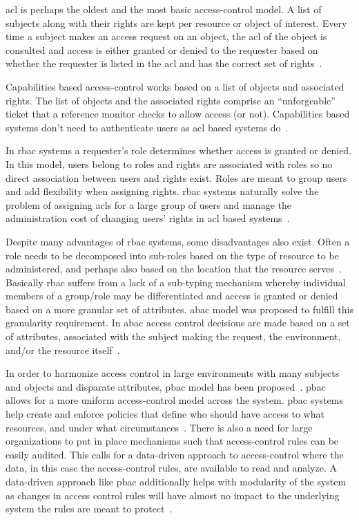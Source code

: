 \ac{acl} is perhaps the oldest and the most basic access-control model. A list of subjects along with their rights are kept per resource or object of interest. Every time a subject makes an access request on an object, the \ac{acl} of the object is consulted and access is either granted or denied to the requester based on whether the requester is listed in the \ac{acl} and has the correct set of rights~\cite{nist}.

Capabilities based access-control works based on a list of objects and associated rights. The list of objects and the associated rights comprise an ``unforgeable'' ticket that a reference monitor checks to allow access (or not). Capabilities based systems don't need to authenticate users as \ac{acl} based systems do~\cite{nist}.

In \ac{rbac} systems a requester's role determines whether access is granted or denied. In this model, users belong to roles and rights are associated with roles so no direct association between users and rights exist. Roles are meant to group users and add flexibility when assigning rights. \ac{rbac} systems naturally solve the problem of assigning \ac{acl}s for a large group of users and manage the administration cost of changing users' rights in \ac{acl} based systems~\cite{nist}.


Despite many advantages of \ac{rbac} systems, some disadvantages also exist. Often a role needs to be decomposed into sub-roles based on the type of resource to be administered, and perhaps also based on the location that the resource serves~\cite{nist}. Basically \ac{rbac} suffers from a lack of a sub-typing mechanism whereby individual members of a group/role may be differentiated and access is granted or denied based on a more granular set of attributes. \ac{abac} model was proposed to fulfill this granularity requirement. In \ac{abac} access control decisions are made based on a set of attributes, associated with the subject making the request, the environment, and/or the resource itself~\cite{nist}. 

In order to harmonize access control in large environments with many subjects and objects and disparate attributes, \ac{pbac} model has been proposed~\cite{nist}. \ac{pbac} allows for a more uniform access-control model across the system. \ac{pbac} systems help create and enforce policies
that define who should have access to what resources, and under what circumstances~\cite{nist}.
There is also a need for large organizations to put in place mechanisms such that access-control rules can be easily audited. This calls for a data-driven approach to access-control where the data, in this case the access-control rules, are available to read and analyze. A data-driven approach like \ac{pbac} additionally helps with modularity of the system as changes in access control rules will have almost no impact to the underlying system the rules are meant to protect~\cite{nist}.

